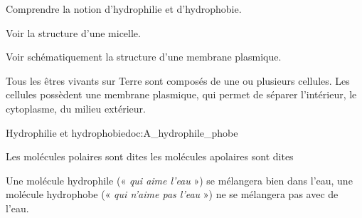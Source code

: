 \tetePremStssBiom
\vspace*{-30pt}

\begin{objectifs}
  \item Comprendre la notion d'hydrophilie et d'hydrophobie.
  \item Voir la structure d'une micelle.
  \item Voir schématiquement la structure d'une membrane plasmique.
\end{objectifs}

\begin{contexte}
  Tous les êtres vivants sur Terre sont composés de une ou plusieurs cellules.
  Les cellules possèdent une membrane plasmique, qui permet de séparer l'intérieur, le cytoplasme, du milieu extérieur.
  
\end{contexte}


\begin{doc}{Hydrophilie et hydrophobie}{doc:A_hydrophile_phobe}
  \begin{importants}
    Les molécules polaires sont dites  les molécules apolaires sont dites 
  \end{importants}
  Une molécule hydrophile («\textit{ qui aime l'eau} ») se mélangera bien dans l'eau, une molécule hydrophobe (« \textit{qui n'aime pas l'eau} ») ne se mélangera pas avec de l'eau.
\end{doc}

